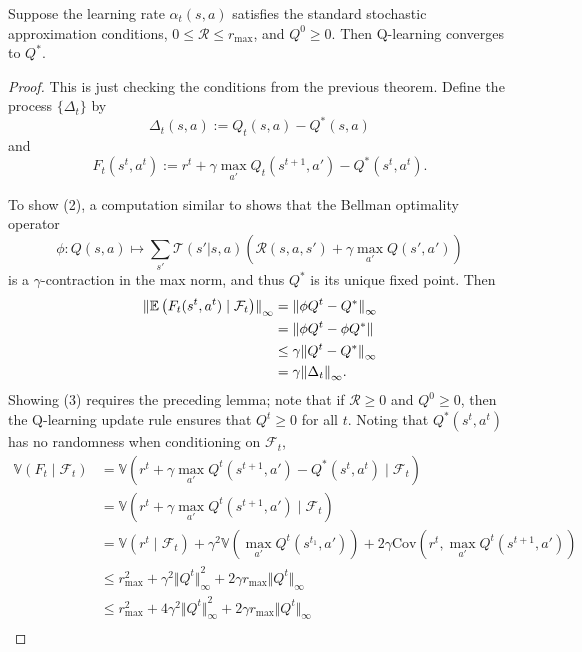 \documentclass[twoside,10pt]{report}
\begin{document}
\begin{prop}
	Suppose the learning rate $\alpha_{t}(s,a)$ satisfies the standard stochastic approximation conditions, $0 \leq \mathcal{R} \leq r_{\text{max}}$, and $Q^{0} \geq 0$. Then Q-learning converges to $Q^{*}$.
\end{prop}
\begin{proof}
	This is just checking the conditions from the previous theorem. Define the process $\{\Delta_{t}\}$ by
	\[
	\Delta_{t}(s,a) := Q_{t}(s,a) - Q^{*}(s,a)
	\] and
	\[
	F_{t}(s^{t},a^{t}) := r^{t} + \gamma \max_{a'} Q_{t}(s^{t+1},a') - Q^{*}(s^{t},a^{t}).
	\] 

	To show (2), a computation similar to  shows that the Bellman optimality operator
	\[
	\phi : Q(s,a) \mapsto \sum_{s'} \mathcal{T}(s'|s,a) \left( \mathcal{R}(s,a,s') + \gamma \max_{a'}Q(s',a') \right)
	\] is a $\gamma$-contraction in the max norm, and thus $Q^{*}$ is its unique fixed point. Then
	\begin{align*}
		{\Vert{\mathbb{E} \left(  F_{t}(s^{t},a^{t}) \;|\; \mathcal{F}_{t} \right)}\Vert}_{\infty} &= {\Vert{\phi Q^{t} - Q^{*}}\Vert}_{\infty} \\
										     &= {\Vert{\phi Q^{t} - \phi Q^{*}}\Vert} \\
										     &\leq \gamma {\Vert{Q^{t} - Q^{*}}\Vert}_{\infty} \\
										     &= \gamma {\Vert{\Delta_{t}}\Vert}_{\infty}.
	\end{align*}
	Showing (3) requires the preceding lemma; note that if $\mathcal{R} \geq 0$ and $Q^{0} \geq 0$, then the Q-learning update rule ensures that $Q^{t} \geq 0$ for all $t$. Noting that $Q^{*}(s^{t},a^{t})$ has no randomness when conditioning on $\mathcal{F}_{t}$,
	\begin{align*}
		\mathbb{V}(F_{t} \;|\; \mathcal{F}_{t}) &= \mathbb{V}(r^{t} + \gamma \max_{a'} Q^{t}(s^{t+1},a') - Q^{*}(s^{t},a^{t}) \;|\; \mathcal{F}_{t}) \\
		&= \mathbb{V}(r^{t} + \gamma \max_{a'} Q^{t}(s^{t+1},a') \;|\; \mathcal{F}_{t}) \\
		&= \mathbb{V}(r^{t} \;|\; \mathcal{F}_{t}) + \gamma^{2}\mathbb{V}(\max_{a'}Q^{t}(s^{t_1},a')) + 2\gamma \text{Cov}( r^{t}, \max_{a'}Q^{t}(s^{t+1},a')) \\
		&\leq r_{\text{max}}^2 + \gamma^{2} {\Vert{Q^{t}}\Vert}_\infty^2 + 2\gamma r_{\text{max}} {\Vert{Q^{t}}\Vert}_{\infty} \\
		&\leq r_{\text{max}}^2 + 4 \gamma^{2} {\Vert{Q^{t}}\Vert}_\infty^2 + 2\gamma r_{\text{max}} {\Vert{Q^{t}}\Vert}_{\infty} \\

\end{align*}
\end{proof}
\end{document}
